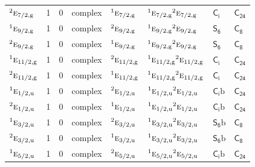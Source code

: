 \documentclass[10pt,a4paper]{article}
\numberwithin{equation}{section}
\newcommand{\grp}[1]{\mathsf{#1}}
\newcommand{\irr}[1]{\text{\normalfont\scshape #1}}
\newcommand{\conjpair}[1]{{}^{#1}}
\newcommand{\ptag}[1]{\mathrm{#1}}
\newcommand{\secondclass}{\mathrm{b}}
\begin{document}
{\begin{longtable}{@{}lrrlllll@{}}
$\conjpair{2}\irr{e}_{7/2,\ptag{g}}$ & 1 & $0$ & complex & $\conjpair{1}\irr{e}_{7/2,\ptag{g}}$ & $\conjpair{1}\irr{e}_{7/2,\ptag{g}}\conjpair{2}\irr{e}_{7/2,\ptag{g}}$ & \href{S2.pdf}{$\grp{C_{i}}$} & $\grp{C_{24}}$\\
$\conjpair{1}\irr{e}_{9/2,\ptag{g}}$ & 1 & $0$ & complex & $\conjpair{2}\irr{e}_{9/2,\ptag{g}}$ & $\conjpair{1}\irr{e}_{9/2,\ptag{g}}\conjpair{2}\irr{e}_{9/2,\ptag{g}}$ & \href{S6.pdf}{$\grp{S_{6}}$} & \href{../../../rotation/data/pdf/C8.pdf}{$\grp{C_{8}}$}\\
$\conjpair{2}\irr{e}_{9/2,\ptag{g}}$ & 1 & $0$ & complex & $\conjpair{1}\irr{e}_{9/2,\ptag{g}}$ & $\conjpair{1}\irr{e}_{9/2,\ptag{g}}\conjpair{2}\irr{e}_{9/2,\ptag{g}}$ & \href{S6.pdf}{$\grp{S_{6}}$} & \href{../../../rotation/data/pdf/C8.pdf}{$\grp{C_{8}}$}\\
$\conjpair{1}\irr{e}_{11/2,\ptag{g}}$ & 1 & $0$ & complex & $\conjpair{2}\irr{e}_{11/2,\ptag{g}}$ & $\conjpair{1}\irr{e}_{11/2,\ptag{g}}\conjpair{2}\irr{e}_{11/2,\ptag{g}}$ & \href{S2.pdf}{$\grp{C_{i}}$} & $\grp{C_{24}}$\\
$\conjpair{2}\irr{e}_{11/2,\ptag{g}}$ & 1 & $0$ & complex & $\conjpair{1}\irr{e}_{11/2,\ptag{g}}$ & $\conjpair{1}\irr{e}_{11/2,\ptag{g}}\conjpair{2}\irr{e}_{11/2,\ptag{g}}$ & \href{S2.pdf}{$\grp{C_{i}}$} & $\grp{C_{24}}$\\
$\conjpair{1}\irr{e}_{1/2,\ptag{u}}$ & 1 & $0$ & complex & $\conjpair{2}\irr{e}_{1/2,\ptag{u}}$ & $\conjpair{1}\irr{e}_{1/2,\ptag{u}}\conjpair{2}\irr{e}_{1/2,\ptag{u}}$ & \href{S2b.pdf}{$\grp{C_{i}}\secondclass$} & $\grp{C_{24}}$\\
$\conjpair{2}\irr{e}_{1/2,\ptag{u}}$ & 1 & $0$ & complex & $\conjpair{1}\irr{e}_{1/2,\ptag{u}}$ & $\conjpair{1}\irr{e}_{1/2,\ptag{u}}\conjpair{2}\irr{e}_{1/2,\ptag{u}}$ & \href{S2b.pdf}{$\grp{C_{i}}\secondclass$} & $\grp{C_{24}}$\\
$\conjpair{1}\irr{e}_{3/2,\ptag{u}}$ & 1 & $0$ & complex & $\conjpair{2}\irr{e}_{3/2,\ptag{u}}$ & $\conjpair{1}\irr{e}_{3/2,\ptag{u}}\conjpair{2}\irr{e}_{3/2,\ptag{u}}$ & \href{S6b.pdf}{$\grp{S_{6}}\secondclass$} & \href{../../../rotation/data/pdf/C8.pdf}{$\grp{C_{8}}$}\\
$\conjpair{2}\irr{e}_{3/2,\ptag{u}}$ & 1 & $0$ & complex & $\conjpair{1}\irr{e}_{3/2,\ptag{u}}$ & $\conjpair{1}\irr{e}_{3/2,\ptag{u}}\conjpair{2}\irr{e}_{3/2,\ptag{u}}$ & \href{S6b.pdf}{$\grp{S_{6}}\secondclass$} & \href{../../../rotation/data/pdf/C8.pdf}{$\grp{C_{8}}$}\\
$\conjpair{1}\irr{e}_{5/2,\ptag{u}}$ & 1 & $0$ & complex & $\conjpair{2}\irr{e}_{5/2,\ptag{u}}$ & $\conjpair{1}\irr{e}_{5/2,\ptag{u}}\conjpair{2}\irr{e}_{5/2,\ptag{u}}$ & \href{S2b.pdf}{$\grp{C_{i}}\secondclass$} & $\grp{C_{24}}$\\

\end{longtable}}
\end{document}
